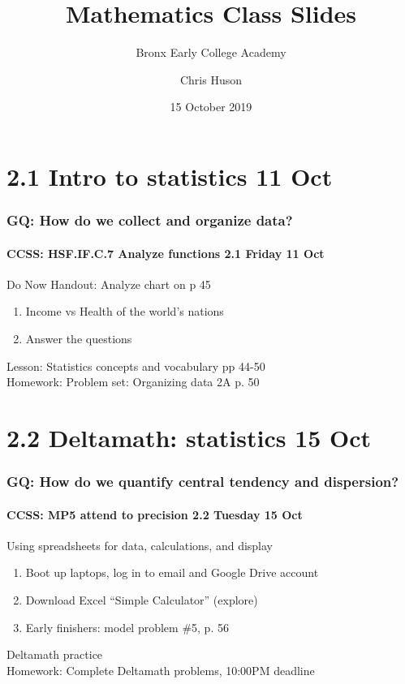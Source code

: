 \documentclass{beamer}
\title{Mathematics Class Slides}
\subtitle{Bronx Early College Academy}
\author{Chris Huson}
\date{15 October 2019}
\begin{document}
\frame{\titlepage}
\section[Outline]{}
\frame{\tableofcontents}

  \section{2.1 Intro to statistics 11 Oct}
  \frame
  {
    \frametitle{GQ: How do we collect and organize data?}
    \framesubtitle{CCSS: HSF.IF.C.7 Analyze functions \hfill \alert{2.1 Friday 11 Oct}}

    \begin{block}{Do Now Handout: Analyze chart on p 45}
    \begin{enumerate}
        \item Income vs Health of the world's nations
        \item Answer the questions
    \end{enumerate}
    \end{block}
    Lesson: Statistics concepts and vocabulary pp 44-50 \\%
    Homework: Problem set: Organizing data 2A p. 50
  }

  \section{2.2 Deltamath: statistics 15 Oct}
  \frame
  {
    \frametitle{GQ: How do we quantify central tendency and dispersion?}
    \framesubtitle{CCSS: MP5 attend to precision \hfill \alert{2.2 Tuesday 15 Oct}}

    \begin{block}{Using spreadsheets for data, calculations, and display}
      \begin{enumerate}
        \item Boot up laptops, log in to email and Google Drive account
        \item Download Excel ``Simple Calculator'' (explore)
        \item Early finishers: model problem \#5, p. 56
    \end{enumerate}
    \end{block}
    Deltamath practice\\ \smallskip
    Homework: Complete Deltamath problems, 10:00PM deadline
  }
\end{document}
